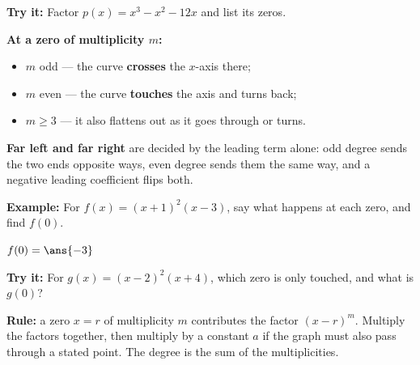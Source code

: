\documentclass[12pt]{article}
\begin{document}
\begin{tryitbox}
\textbf{Try it:} \quad Factor $p(x) = x^3 - x^2 - 12x$ and list its zeros.\\[2pt]
\end{tryitbox}


\begin{formulabox}
\textbf{At a zero of multiplicity $m$:}
\begin{itemize}[leftmargin=1.2cm, itemsep=1pt, topsep=2pt]
  \item $m$ odd --- the curve \textbf{crosses} the $x$-axis there;
  \item $m$ even --- the curve \textbf{touches} the axis and turns back;
  \item $m \ge 3$ --- it also flattens out as it goes through or turns.
\end{itemize}
\textbf{Far left and far right} are decided by the leading term alone: odd degree
sends the two ends opposite ways, even degree sends them the same way, and a
negative leading coefficient flips both.
\end{formulabox}

\begin{examplebox}
\textbf{Example:} \quad For $f(x) = (x+1)^2(x-3)$, say what happens at each zero,
and find $f(0)$.

$f(0) = \ans{-3}$
\end{examplebox}

\begin{tryitbox}
\textbf{Try it:} \quad For $g(x) = (x-2)^2(x+4)$, which zero is only touched, and
what is $g(0)$?\\[2pt]
\end{tryitbox}


\begin{formulabox}
\textbf{Rule:} a zero $x = r$ of multiplicity $m$ contributes the factor
$(x - r)^m$. Multiply the factors together, then multiply by a constant $a$ if the
graph must also pass through a stated point. The degree is the sum of the
multiplicities.
\end{formulabox}
\end{document}
